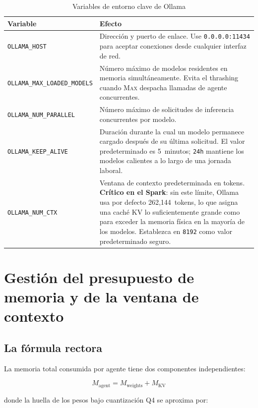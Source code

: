 \begin{table}[h]
\centering
\caption{Variables de entorno clave de Ollama}
\label{tab:ollama-env}
\begin{tabular}{lp{9cm}}
\toprule
Variable & Efecto \\
\midrule
\texttt{OLLAMA\_HOST} &
  Dirección y puerto de enlace. Use \texttt{0.0.0.0:11434} para aceptar
  conexiones desde cualquier interfaz de red. \\
\texttt{OLLAMA\_MAX\_LOADED\_MODELS} &
  Número máximo de modelos residentes en memoria simultáneamente. Evita
  el thrashing cuando \textsc{Max} despacha llamadas de agente concurrentes. \\
\texttt{OLLAMA\_NUM\_PARALLEL} &
  Número máximo de solicitudes de inferencia concurrentes por modelo. \\
\texttt{OLLAMA\_KEEP\_ALIVE} &
  Duración durante la cual un modelo permanece cargado después de su
  última solicitud. El valor predeterminado es 5~minutos; \texttt{24h}
  mantiene los modelos calientes a lo largo de una jornada laboral. \\
\texttt{OLLAMA\_NUM\_CTX} &
  Ventana de contexto predeterminada en tokens. \textbf{Crítico en el
  Spark}: sin este límite, Ollama usa por defecto 262{,}144~tokens, lo
  que asigna una caché KV lo suficientemente grande como para exceder la
  memoria física en la mayoría de los modelos. Establezca en
  \texttt{8192} como valor predeterminado seguro. \\
\bottomrule
\end{tabular}
\end{table}

\section{Gestión del presupuesto de memoria y de la ventana de contexto}
\label{sec:memory}

\subsection{La fórmula rectora}

La memoria total consumida por agente tiene dos componentes independientes:

\begin{equation}
M_{\text{agent}} = M_{\text{weights}} + M_{\text{KV}}
\label{eq:memory}
\end{equation}

\noindent donde la huella de los pesos bajo cuantización Q4 se aproxima por:

